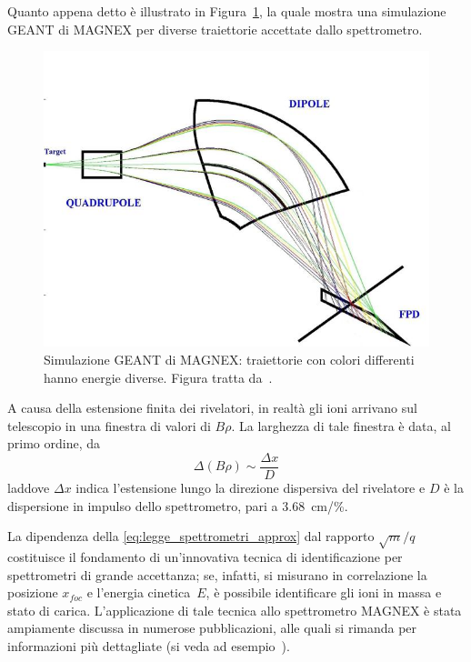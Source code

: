 Quanto appena detto è illustrato in Figura~\ref{fig:magnex_diverse_traiettorie}, la quale mostra una simulazione GEANT di MAGNEX per diverse traiettorie accettate dallo spettrometro.
\begin{figure} [!t]
	\centering
	\includegraphics[width=\textwidth, keepaspectratio]{Grafici/magnex_traiettorie_diverse.png}
	\caption{Simulazione GEANT di MAGNEX: traiettorie con colori differenti hanno energie diverse. Figura tratta da~\cite{cappuzzello:epja16}.} \label{fig:magnex_diverse_traiettorie}
\end{figure}



A causa della estensione finita dei rivelatori, in realtà gli ioni arrivano sul telescopio in una finestra di valori di $B \rho$. La larghezza di tale finestra è data, al primo ordine, da
\begin{equation} \label{eq:finestra_Brho}
	\Delta \left(B \rho \right) \sim \frac{\Delta x}{D}
\end{equation} 
laddove $\Delta x$ indica l'estensione lungo la direzione dispersiva del rivelatore e $D$ è la dispersione in impulso dello spettrometro, pari a 3.68~cm/\%.

La dipendenza della \ref{eq:legge_spettrometri_approx} dal rapporto $\sqrt{m}/q$ costituisce il fondamento di un'innovativa tecnica di identificazione per spettrometri di grande accettanza; se, infatti, si misurano in correlazione la posizione $x_{foc}$ e l'energia cinetica~$E$, è possibile identificare gli ioni in massa e stato di carica.
L'applicazione di tale tecnica allo spettrometro MAGNEX è stata ampiamente discussa in numerose pubblicazioni, alle quali si rimanda per informazioni più dettagliate (si veda ad esempio~\cite{cappuzzello:nima10}). 

